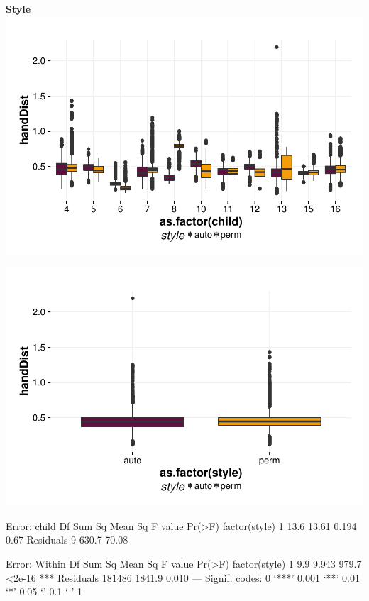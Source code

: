 \documentclass{article}
\begin{document}
\textbf{Style}
\includegraphics{features-plot_handdistance_child_style_quiz}

\includegraphics{features-plot_handdistance_style_quiz}

\begin{Schunk}
\begin{Soutput}
Error: child
              Df Sum Sq Mean Sq F value Pr(>F)
factor(style)  1   13.6   13.61   0.194   0.67
Residuals      9  630.7   70.08               

Error: Within
                  Df Sum Sq Mean Sq F value Pr(>F)    
factor(style)      1    9.9   9.943   979.7 <2e-16 ***
Residuals     181486 1841.9   0.010                   
---
Signif. codes:  0 ‘***’ 0.001 ‘**’ 0.01 ‘*’ 0.05 ‘.’ 0.1 ‘ ’ 1
\end{Soutput}
\end{Schunk}
\end{document}
